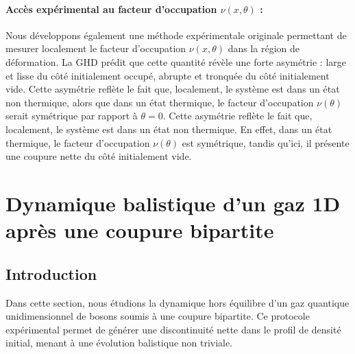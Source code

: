 \paragraph*{Accès expérimental au facteur d’occupation $\nu(x,\theta)$ :}
Nous développons également une méthode expérimentale originale permettant de mesurer localement le facteur d’occupation $\nu(x,\theta)$ dans la région de déformation. La \gls{GHD} prédit que cette quantité révèle une forte asymétrie : large et lisse du côté initialement occupé, abrupte et tronquée du côté initialement vide. Cette asymétrie reflète le fait que, localement, le système est dans un état non thermique, alors que dans un état thermique, le facteur d'occupation $\nu(\theta)$ serait symétrique par rapport à $\theta = 0$.
Cette asymétrie reflète le fait que, localement, le système est dans un état non thermique. En effet, dans un état thermique, le facteur d'occupation $\nu(\theta)$ est symétrique, tandis qu'ici, il présente une coupure nette du côté initialement vide.



\section{Dynamique balistique d’un gaz 1D après une coupure bipartite}

\subsection*{Introduction}

Dans cette section, nous étudions la dynamique hors équilibre d’un gaz quantique unidimensionnel de bosons soumis à une coupure bipartite. Ce protocole expérimental permet de générer une discontinuité nette dans le profil de densité initial, menant à une évolution balistique non triviale.

